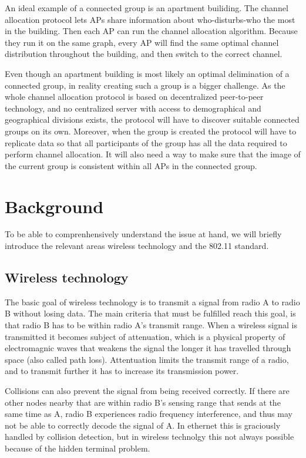 \documentclass[a4paper,UKenglish]{report}
\begin{document}
An ideal example of a connected group is an apartment builiding. The channel allocation protocol lets APs share information about who-disturbs-who the most in the building.
Then each AP can run the channel allocation algorithm. Because they run it on the same graph, every AP will find the same optimal channel distribution throughout the building,
and then switch to the correct channel. 

Even though an apartment building is most likely an optimal delimination of a connected group, in reality creating such a group is a bigger challenge. As the whole channel allocation
protocol is based on decentralized peer-to-peer technology, and no centralized server with access to demographical and geographical divisions exists, the protocol will
have to discover suitable connected groups on its own. Moreover, when the group is created the protocol will have to replicate data so that
all participants of the group has all the data required to perform channel allocation. It will also need a way to make sure that the image of the current group
is consistent within all APs in the connected group. 

\chapter{Background}
To be able to comprenhensively understand the issue at hand, we will briefly introduce the relevant areas wireless technology and the 802.11 standard.
\section{Wireless technology}
The basic goal of wireless technology is to transmit a signal from radio A to radio B without losing data.
The main criteria that must be fulfilled reach this goal, is that radio B has to be within radio A's transmit range.
When a wireless signal is transmitted it becomes subject of attenuation, which is a physical property of electromagnic waves 
that weakens the signal the longer it has travelled through space (also called path loss). Attentuation limits
the transmit range of a radio, and to transmit further it has to increase its transmission power.

Collisions can also prevent the signal from being received correctly.
If there are other nodes nearby that are within radio B's sensing range that sends at the same time as A, radio B experiences
radio frequency interference, and thus may not be able to correctly decode the signal of A. In ethernet this
is graciously handled by collision detection, but in wireless technolgy this not always possible because of the hidden terminal problem.
\end{document}
